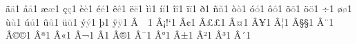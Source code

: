{        {^^e4}{{\textcolor{gray}{\"{a}}}}1  %
        {^^e5}{{\textcolor{gray}{\aa}}}1  %
        {^^e6}{{\textcolor{gray}{\ae}}}1  %
        {^^e7}{{\textcolor{gray}{\c{c}}}}1  %
        {^^e8}{{\textcolor{gray}{\`{e}}}}1  %
        {^^e9}{{\textcolor{gray}{\'{e}}}}1  %
        {^^ea}{{\textcolor{gray}{\^{e}}}}1  %
        {^^eb}{{\textcolor{gray}{\"{e}}}}1  %
        {^^ec}{{\textcolor{gray}{\`{i}}}}1  %
        {^^ed}{{\textcolor{gray}{\'{i}}}}1  %
        {^^ee}{{\textcolor{gray}{\^{i}}}}1  %
        {^^ef}{{\textcolor{gray}{\"{i}}}}1  %
        {^^f0}{{\textcolor{gray}{\dh}}}1  %
        {^^f1}{{\textcolor{gray}{\~{n}}}}1  %
        {^^f2}{{\textcolor{gray}{\`{o}}}}1  %
        {^^f3}{{\textcolor{gray}{\'{o}}}}1  %
        {^^f4}{{\textcolor{gray}{\^{o}}}}1  %
        {^^f5}{{\textcolor{gray}{\~{o}}}}1  %
        {^^f6}{{\textcolor{gray}{\"{o}}}}1  %
        {^^f7}{{\textcolor{gray}{\textdiv}}}1  %
        {^^f8}{{\textcolor{gray}{\o}}}1  %
        {^^f9}{{\textcolor{gray}{\`{u}}}}1  %
        {^^fa}{{\textcolor{gray}{\'{u}}}}1  %
        {^^fb}{{\textcolor{gray}{\^{u}}}}1  %
        {^^fc}{{\textcolor{gray}{\"{u}}}}1  %
        {^^fd}{{\textcolor{gray}{\'{y}}}}1  %
        {^^fe}{{\textcolor{gray}{\th}}}1  %
        {^^ff}{{\textcolor{gray}{\"{y}}}}1  %
        {^^c2^^a0}{{~}}1  %
        {^^c2^^a1}{{!`}}1  %
        {^^c2^^a2}{{\textcent}}1  %
        {^^c2^^a3}{{\pounds}}1  %
        {^^c2^^a4}{{\textcurrency}}1  %
        {^^c2^^a5}{{\textyen}}1  %
        {^^c2^^a6}{{\textbrokenbar}}1  %
        {^^c2^^a7}{{\S}}1  %
        {^^c2^^a8}{{\textasciidieresis}}1  %
        {^^c2^^a9}{{\copyright}}1  %
        {^^c2^^aa}{{\textordfeminine}}1  %
        {^^c2^^ab}{{\guillemotleft}}1  %
        {^^c2^^ac}{{\textlnot}}1  %
        {^^c2^^ad}{{\-}}1  %
        {^^c2^^ae}{{\textregistered}}1  %
        {^^c2^^af}{{\textasciimacron}}1  %
        {^^c2^^b0}{{\textdegree}}1  %
        {^^c2^^b1}{{\textpm}}1  %
        {^^c2^^b2}{{\texttwosuperior}}1  %
        {^^c2^^b3}{{\textthreesuperior}}1  %
        {^^c2^^b4}{{\textasciiacute}}1  %
}
